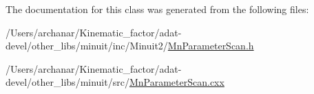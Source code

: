 The documentation for this class was generated from the following files\+:\begin{DoxyCompactItemize}
\item 
/\+Users/archanar/\+Kinematic\+\_\+factor/adat-\/devel/other\+\_\+libs/minuit/inc/\+Minuit2/\mbox{\hyperlink{adat-devel_2other__libs_2minuit_2inc_2Minuit2_2MnParameterScan_8h}{Mn\+Parameter\+Scan.\+h}}\item 
/\+Users/archanar/\+Kinematic\+\_\+factor/adat-\/devel/other\+\_\+libs/minuit/src/\mbox{\hyperlink{adat-devel_2other__libs_2minuit_2src_2MnParameterScan_8cxx}{Mn\+Parameter\+Scan.\+cxx}}\end{DoxyCompactItemize}
